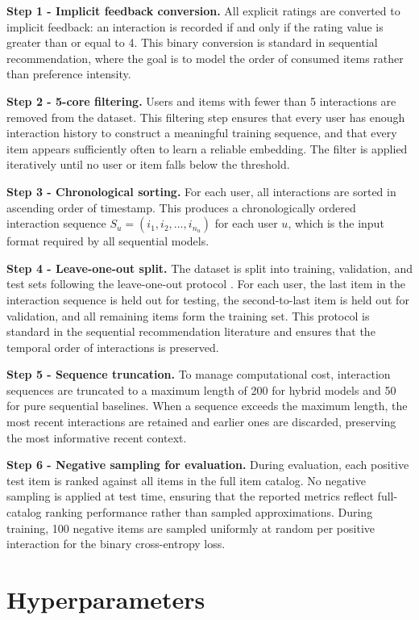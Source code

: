 \documentclass[12pt,a4paper]{report}
\begin{document}
\textbf{Step 1 - Implicit feedback conversion.}
All explicit ratings are converted to implicit feedback: an interaction is
recorded if and only if the rating value is greater than or equal to 4. This
binary conversion is standard in sequential recommendation, where the goal is
to model the order of consumed items rather than preference intensity.

\textbf{Step 2 - 5-core filtering.}
Users and items with fewer than 5 interactions are removed from the dataset.
This filtering step ensures that every user has enough interaction history to
construct a meaningful training sequence, and that every item appears
sufficiently often to learn a reliable embedding. The filter is applied
iteratively until no user or item falls below the threshold.

\textbf{Step 3 - Chronological sorting.}
For each user, all interactions are sorted in ascending order of timestamp.
This produces a chronologically ordered interaction sequence
\(S_u = (i_1, i_2, \ldots, i_{n_u})\) for each user \(u\), which is the
input format required by all sequential models.

\textbf{Step 4 - Leave-one-out split.}
The dataset is split into training, validation, and test sets following the
leave-one-out protocol \citep{kang2018sasrec}. For each user, the last item
in the interaction sequence is held out for testing, the second-to-last item
is held out for validation, and all remaining items form the training set.
This protocol is standard in the sequential recommendation literature and
ensures that the temporal order of interactions is preserved.

\textbf{Step 5 - Sequence truncation.}
To manage computational cost, interaction sequences are truncated to a maximum
length of 200 for hybrid models and 50 for pure sequential baselines. When a
sequence exceeds the maximum length, the most recent interactions are retained
and earlier ones are discarded, preserving the most informative recent context.

\textbf{Step 6 - Negative sampling for evaluation.}
During evaluation, each positive test item is ranked against all items in the
full item catalog. No negative sampling is applied at test time, ensuring that
the reported metrics reflect full-catalog ranking performance rather than
sampled approximations. During training, 100 negative items are sampled
uniformly at random per positive interaction for the binary cross-entropy loss.


\section{Hyperparameters}
\label{sec:hyperparameters}
\end{document}
